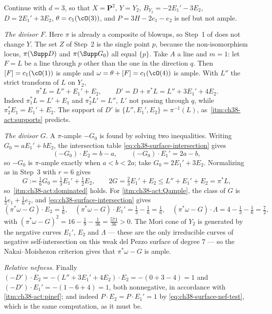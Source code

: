 \begin{example}
\label{ex:ch38-activation-surface}
Continue  with $d=3$, so that
$X=\mathbf P^2$, $Y=Y_2$, $B_{Y_2}=-2E_1'-3E_2$,
$D=2E_1'+3E_2$, $\theta=c_1(\cO(3))$, and
$P=3H-2e_1-e_2$ is nef but not ample.

\emph{The divisor $F$.}  Here $\pi$ is already a composite of blowups,
so Step~1 of  does not change $Y$.  The set
$Z$ of Step~2 is the single point $p$, because the non-isomorphism
locus, $\pi(\Supp D)$ and $\pi(\Supp G_0)$ all equal $\{p\}$.  Take
$A$ a line and $m=1$: let $F=L$ be a line through $p$ other than
the one in the direction $q$.  Then $[F]=c_1(\cO(1))$ is ample and
$\omega=\theta+[F]=c_1(\cO(4))$ is ample.  With $L''$ the strict
transform of $L$ on $Y_2$,
\[
 \pi^*L=L''+E_1'+E_2,
 \qquad
 D'=D+\pi^*L=L''+3E_1'+4E_2 .
\tag{38.28}\label{eq:ch38-activation-surface-D}
\]
Indeed $\pi_1^*L=L'+E_1$ and $\pi_2^*L'=L''$, $L'$ not passing
through $q$, while $\pi_2^*E_1=E_1'+E_2$.  The support of $D'$ is
$\{L'',E_1',E_2\}=\pi^{-1}(L)$, as
\,\cref{itm:ch38-act:supports} predicts.

\emph{The divisor $G$.}  A $\pi$-ample $-G_0$ is found by solving two
inequalities.  Writing $G_0=aE_1'+bE_2$, the intersection table
\eqref{eq:ch38-surface-intersection} gives
\[
 (-G_0)\cdot E_2=b-a,\qquad (-G_0)\cdot E_1'=2a-b,
\]
so $-G_0$ is $\pi$-ample exactly when $a<b<2a$; take
$G_0=2E_1'+3E_2$.  Normalizing as in Step~3 with $r=6$ gives
\[
 G:=\tfrac16G_0=\tfrac13E_1'+\tfrac12E_2,
 \qquad
 2G=\tfrac23E_1'+E_2\leq L''+E_1'+E_2=\pi^*L,
\]
so \,\cref{itm:ch38-act:dominated} holds.  For
\cref{itm:ch38-act:Qample}, the class of $G$ is
$\tfrac13e_1+\tfrac16e_2$, and \eqref{eq:ch38-surface-intersection}
gives
\[
 (\pi^*\omega-G)\cdot E_2=\tfrac16,\quad
 (\pi^*\omega-G)\cdot E_1'=\tfrac13-\tfrac16=\tfrac16,\quad
 (\pi^*\omega-G)\cdot\Lambda=4-\tfrac13-\tfrac16=\tfrac72,
\]
with $(\pi^*\omega-G)^2=16-\tfrac19-\tfrac1{36}=\tfrac{571}{36}>0$.  The
Mori cone of $Y_2$ is generated by the negative curves $E_1'$,
$E_2$ and $\Lambda$ --- these are the only irreducible curves of
negative self-intersection on this weak del Pezzo surface of degree
$7$ --- so the Nakai--Moishezon criterion gives that
$\pi^*\omega-G$ is ample.

\emph{Relative nefness.}  Finally
$(-D')\cdot E_2=-(L''+3E_1'+4E_2)\cdot E_2=-(0+3-4)=1$ and
$(-D')\cdot E_1'=-(1-6+4)=1$, both nonnegative, in accordance with
\,\cref{itm:ch38-act:pinef}; and indeed
$P\cdot E_2=P\cdot E_1'=1$ by
\eqref{eq:ch38-surface-nef-test}, which is the same computation, as it
must be.
\end{example}


